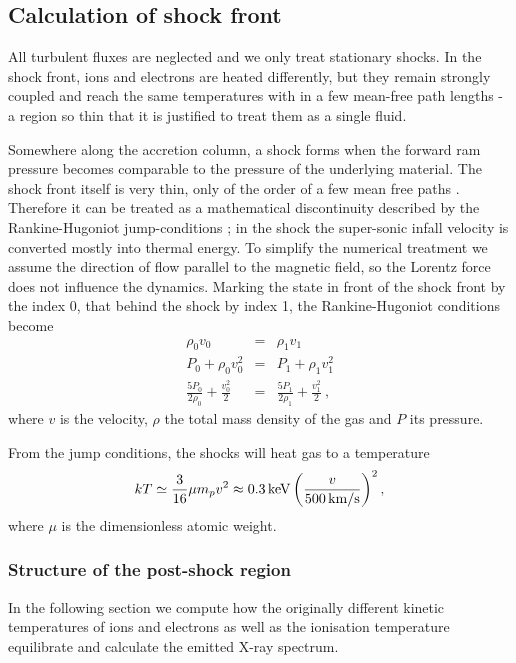 \documentclass[graybox, nosecnum]{svmult}
\begin{document}
\subsection{Calculation of shock front}
All turbulent fluxes are neglected and we only treat stationary shocks. In the shock front, ions and electrons are heated differently, but they remain strongly coupled and reach the same temperatures with in a few mean-free path lengths - a region so thin that it is justified to treat them as a single fluid. 

Somewhere along the accretion column, a shock forms when the forward ram pressure becomes comparable to the pressure of the underlying material. The shock front itself is very thin, only of the order of a few mean free paths \citep{raizerzeldovich}. Therefore it can be treated as a mathematical discontinuity described by the Rankine-Hugoniot jump-conditions \citep[][chap.~7, \S~15]{raizerzeldovich}; in the shock the super-sonic infall velocity is converted mostly into thermal energy. To simplify the numerical treatment we assume the direction of flow parallel to the magnetic field, so the Lorentz force does not influence the dynamics. Marking the state in front of the shock front by the index 0, that behind the shock by index 1, the Rankine-Hugoniot conditions become
\begin{eqnarray}
\rho_0 v_0 &=& \rho_1 v_1 \label{RH1}\\
P_0+\rho_0 v_0^2 &=& P_1+\rho_1 v_1^2 \label{RH2}\\
\frac{5 P_0}{2\rho_0}+\frac{v_0^2}{2}&=&\frac{5 P_1}{2\rho_1}+\frac{v_1^2}{2} \ ,\label{RH3}
\end{eqnarray}
where $v$ is the velocity, $\rho$ the total mass density of the gas and $P$ its pressure. 

From the jump conditions, the shocks will heat gas to a temperature
$$
kT \simeq \frac{3}{16}\mu m_p v^{2} \approx 0.3\,{\rm keV}\left(\frac{v}{500\,{\rm km/s}}\right)^{2},
\label{eqn:Tshock}
$$
where $\mu$ is the dimensionless atomic weight.

\subsubsection{Structure of the post-shock region}

In the following section we compute how the originally different kinetic temperatures of ions and electrons as well as the ionisation temperature
equilibrate and calculate the emitted X-ray spectrum.
\end{document}
